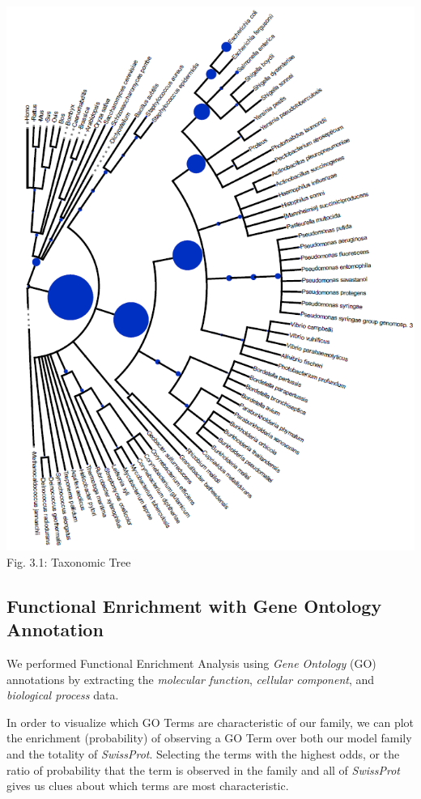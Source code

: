 \documentclass[10pt,twocolumn,letterpaper]{article}
\begin{document}
\begin{center}
    \includegraphics[scale=0.40]{report/img/taxonomy_tree.png}\\
    \small{Fig. 3.1: Taxonomic Tree}
\end{center}

\subsection{Functional Enrichment with Gene Ontology Annotation}

We performed Functional Enrichment Analysis using \textit{Gene Ontology} (GO) annotations by extracting the \textit{molecular function}, \textit{cellular component}, and \textit{biological process} data.

In order to visualize which GO Terms are characteristic of our family, we can plot the enrichment (probability) of observing a GO Term over both our model family and the totality of \textit{SwissProt}. Selecting the terms with the highest odds, or the ratio of probability that the term is observed in the family and all of \textit{SwissProt} gives us clues about which terms are most characteristic. 
\end{document}
